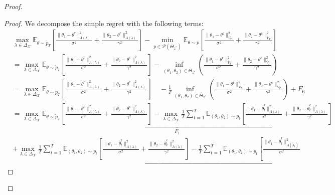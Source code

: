 \documentclass[accepted]{uai2025} %
\theoremstyle{plain}
\theoremstyle{definition}
\theoremstyle{remark}
\newcommand{\hthetact}{\hat{\theta}_t^{\mathrm{c}}}
\newcommand{\hthetart}{\hat{\theta}_t^{\mathrm{r}}}
\begin{document}
\begin{proof}
\begin{proof}
We decompose the simple regret with the following terms:
\begin{align}
&\max_{\lambda \in \Delta_{\mathcal{X}}} \mathbb{E}_{\theta \sim \tilde{p}_{T}} 
\left[ \frac{\|\theta_1 - \theta^\mathrm{r}\|_{A(\lambda)}^2}{\sigma^2} 
+ \frac{\|\theta_2 - \theta^\mathrm{c}\|_{A(\lambda)}^2}{\gamma^2}  \right] 
- \min_{p \in \mathcal{P}(\overline{\Theta}_{z^*})} \mathbb{E}_{\theta \sim p} 
\left[ \frac{\|\theta_1 - \theta^\mathrm{r}\|_{\overline{V}_T}^2}{\sigma^2} 
+ \frac{\|\theta_2 - \theta^\mathrm{c}\|_{\overline{V}_T}^2}{\gamma^2}  \right] \nonumber \\
&= \max_{\lambda \in \Delta_{\mathcal{X}}} \mathbb{E}_{\theta \sim \tilde{p}_{T}} 
\left[ \frac{\|\theta_1 - \theta^\mathrm{r}\|_{A(\lambda)}^2}{\sigma^2} 
+ \frac{\|\theta_2 - \theta^\mathrm{c}\|_{A(\lambda)}^2}{\gamma^2}  \right] 
- \inf_{(\theta_1, \theta_2) \in \overline{\Theta}_{z^*}} 
\left(\frac{\|\theta_1 - \theta^\mathrm{r}\|_{\overline{V}_T}^2}{\sigma^2} 
+ \frac{\|\theta_2 - \theta^\mathrm{c}\|_{\overline{V}_T}^2}{\gamma^2}\right) \nonumber \\
&=\max_{\lambda \in \Delta_{\mathcal{X}}} \mathbb{E}_{\theta \sim \tilde{p}_{T}} 
\left[ \frac{\|\theta_1 - \theta^\mathrm{r}\|_{A(\lambda)}^2}{\sigma^2} 
+ \frac{\|\theta_2 - \theta^\mathrm{c}\|_{A(\lambda)}^2}{\gamma^2}  \right] \quad - \frac{1}{T} \inf_{(\theta_1, \theta_2) \in \overline{\Theta}_{z^*}} 
\left(\frac{\|\theta_1 - \theta^\mathrm{r}\|_{V_{T}}^2}{\sigma^2} 
+ \frac{\|\theta_2 - \theta^\mathrm{c}\|_{V_{T}}^2}{\gamma^2}\right) + F_6\nonumber  \\
&= \underbrace{\max_{\lambda \in \Delta_{\mathcal{X}}} \mathbb{E}_{\theta \sim \tilde{p}_{T}} 
\left[ \frac{\|\theta_1 - \theta^\mathrm{r}\|_{A(\lambda)}^2}{\sigma^2} 
+ \frac{\|\theta_2 - \theta^\mathrm{c}\|_{A(\lambda)}^2}{\gamma^2}  \right] 
- \max_{\lambda \in \Delta_{\mathcal{X}}} \frac{1}{T} 
\sum_{t=1}^{T} \mathbb{E}_{(\theta_1, \theta_2) \sim p_t} 
\left[ \frac{\|\theta_1 - \hthetart\|_{A(\lambda)}^2}{\sigma^2} 
+ \frac{\|\theta_2 - \hthetact\|_{{A}(\lambda)}^2}{\gamma^2}  \right] \nonumber }_{F_1} \\
& + \underbrace{ \max_{\lambda \in \Delta_{\mathcal{X}}} \frac{1}{T} 
\sum_{t=1}^{T} \mathbb{E}_{(\theta_1, \theta_2) \sim p_t} 
\left[ \frac{\|\theta_1 - \hthetart\|_{A(\lambda)}^2}{\sigma^2} 
+ \frac{\|\theta_2 - \hthetact\|_{A(\lambda)}^2}{\gamma^2}  \right] 
- \frac{1}{T} \sum_{t=1}^{T} \mathbb{E}_{(\theta_1, \theta_2) \sim p_t} 
\left[ \frac{\|\theta_1 - \hthetart\|_{A(\tilde{\lambda}_t)}^2}{\sigma^2} 
}
\end{align}
\end{proof}
\end{proof}
\end{document}
